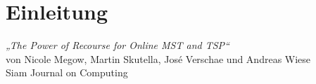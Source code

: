 \section{Einleitung}
\begin{frame}{\insertsection}
\center
\emph{„The Power of Recourse for Online MST and TSP“}\\
\vspace{2em}
von Nicole Megow, Martin Skutella, José Verschae und  Andreas Wiese\\
\vspace{2em}
Siam Journal on Computing\\
\vspace{2em}
\cite{recourse2016}
\end{frame}
